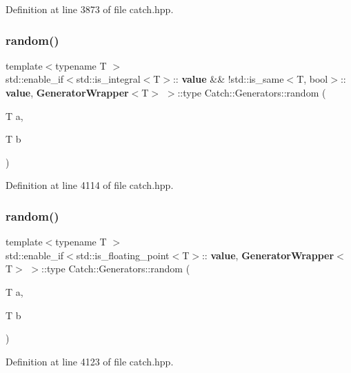 Definition at line 3873 of file catch.\+hpp.

\mbox{\label{namespace_catch_1_1_generators_a5003f0b96aaa4b1a53ebd81f4e93ab0c}} 
\subsubsection{random()\hspace{0.1cm}{\footnotesize\ttfamily [1/2]}}
{\footnotesize\ttfamily template$<$typename T $>$ \\
std\+::enable\+\_\+if$<$std\+::is\+\_\+integral$<$T$>$\+::\textbf{ value} \&\& !std\+::is\+\_\+same$<$T, bool$>$\+::\textbf{ value},\textbf{ Generator\+Wrapper}$<$T$>$ $>$\+::type Catch\+::\+Generators\+::random (\begin{DoxyParamCaption}\item[{T}]{a,  }\item[{T}]{b }\end{DoxyParamCaption})}



Definition at line 4114 of file catch.\+hpp.

\mbox{\label{namespace_catch_1_1_generators_a677b543146adcdfe23fdfff48007a57e}} 
\subsubsection{random()\hspace{0.1cm}{\footnotesize\ttfamily [2/2]}}
{\footnotesize\ttfamily template$<$typename T $>$ \\
std\+::enable\+\_\+if$<$std\+::is\+\_\+floating\+\_\+point$<$T$>$\+::\textbf{ value},\textbf{ Generator\+Wrapper}$<$T$>$ $>$\+::type Catch\+::\+Generators\+::random (\begin{DoxyParamCaption}\item[{T}]{a,  }\item[{T}]{b }\end{DoxyParamCaption})}



Definition at line 4123 of file catch.\+hpp.

\mbox{\label{namespace_catch_1_1_generators_a3c79134931f824e63588bfa5baa77a43}} 
